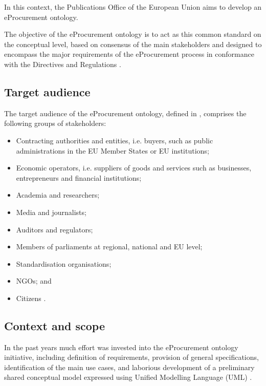 	In this context, the Publications Office of the European Union aims to develop an eProcurement
ontology.
	
	The objective of the eProcurement ontology is to act as this common standard on the	conceptual level, based on consensus of the main stakeholders and designed to encompass the major requirements of the eProcurement process in conformance with the Directives and Regulations \citep{directive-2014/23/EU,directive-2014/24/EU,directive-2014/25/EU,directive-2014/55/EU}.
	
	\subsection{Target audience}
	\label{sec:audience}
	
	The target audience of the eProcurement ontology, defined in \citep{d4.07-2016}, comprises the following groups of stakeholders:
	\begin{itemize}
		\item Contracting authorities and entities, i.e. buyers, such as public administrations in the EU Member States or EU institutions;
		\item Economic operators, i.e. suppliers of goods and services such as businesses, entrepreneurs and financial institutions;
		\item Academia and researchers;
		\item Media and journalists;
		\item Auditors and regulators;
		\item Members of parliaments at regional, national and EU level;
		\item Standardisation organisations;
		\item NGOs; and
		\item Citizens \cite{d4.07-2016}.
	\end{itemize}	
	
	\subsection{Context and scope}
	\label{sec:context}
	
	In the past years much effort was invested into the eProcurement ontology initiative, including definition of requirements, provision of general specifications, identification of the main use cases, and laborious development of a preliminary shared conceptual model expressed using Unified Modelling Language (UML) \cite{uml-userguide,uml2.5}. 
	
